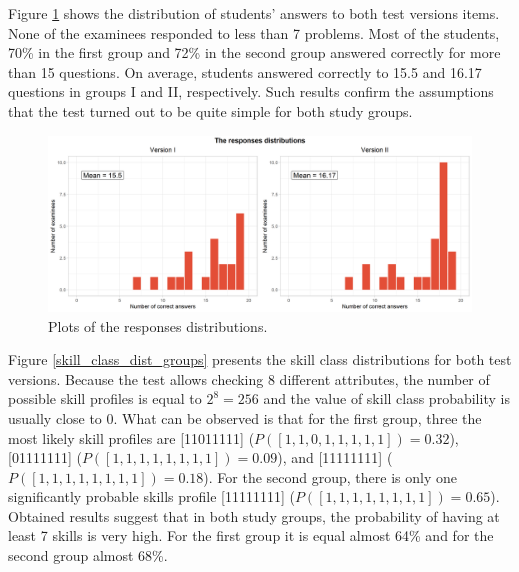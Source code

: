 \documentclass[english]{pwr_wmat_praca_dyplomowa}
\theoremstyle{plain}
\theoremstyle{definition}
\numberwithin{theorem}{chapter}
\begin{document}
Figure \ref{histogram_ans_groups} shows the distribution of students' answers to both test versions items. None of the examinees responded to less than 7 problems. Most of the students, 70\% in the first group and 72\% in the second group answered correctly for more than 15 questions. On average, students answered correctly to 15.5 and 16.17 questions in groups I and II, respectively. Such results confirm the assumptions that the test turned out to be quite simple for both study groups.

\begin{figure}[h!]
	\centering
	\includegraphics[width=\textwidth]{Responses_distributions.png}
	\caption{Plots of the responses distributions.}
	\label{histogram_ans_groups}
\end{figure}

Figure \ref{skill_class_dist_groups} presents the skill class distributions for both test versions. Because the test allows checking 8 different attributes, the number of possible skill profiles is equal to $2^8 = 256$ and the value of skill class probability is usually close to 0. What can be observed is that for the first group, three the most likely skill profiles are [11011111] ($P([1,1,0,1,1,1,1,1])=0.32$), [01111111] ($P([1,1,1,1,1,1,1,1])=0.09$), and [11111111] ($P([1,1,1,1,1,1,1,1])=0.18$). For the second group, there is only one significantly probable skills profile [11111111] ($P([1,1,1,1,1,1,1,1])=0.65$). Obtained results suggest that in both study groups, the probability of having at least 7 skills is very high. For the first group it is equal almost 64\% and for the second group almost 68\%.
\end{document}
